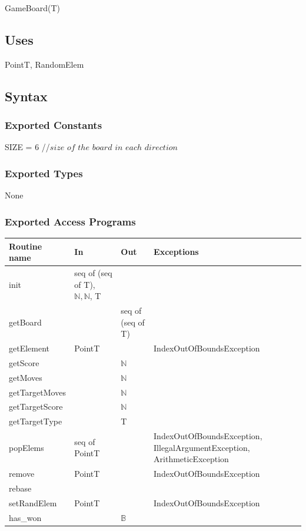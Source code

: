 \documentclass[12pt]{article}
\begin{document}
GameBoard(T)

\subsection* {Uses}

PointT, RandomElem

\subsection* {Syntax}

\subsubsection* {Exported Constants}

SIZE = 6 //$size$ $of$ $the$ $board$ $in$ $each$ $direction$ 

\subsubsection* {Exported Types}

None
\subsubsection* {Exported Access Programs}

\begin{tabular}{| l | l | l | p{5.5cm} |}
\hline
\textbf{Routine name} & \textbf{In} & \textbf{Out} & \textbf{Exceptions}\\
\hline
init & seq of (seq of T), $\mathbb{N}, \mathbb{N}$, T &  &\\
\hline
getBoard & & seq of (seq of T) & \\
\hline
getElement & PointT &  & IndexOutOfBoundsException \\
\hline
getScore & & $\mathbb{N}$ & \\
\hline
getMoves & & $\mathbb{N}$ & \\
\hline
getTargetMoves & & $\mathbb{N}$ & \\
\hline
getTargetScore & & $\mathbb{N}$ & \\
\hline
getTargetType & & T & \\
\hline
popElems & seq of PointT &  &IndexOutOfBoundsException, IllegalArgumentException, ArithmeticException\\
\hline
remove & PointT & & IndexOutOfBoundsException \\
\hline
rebase & & & \\
\hline
setRandElem&PointT& & IndexOutOfBoundsException\\
\hline
has\_won & & $\mathbb{B}$ & \\
\hline

\end{tabular}
\end{document}
